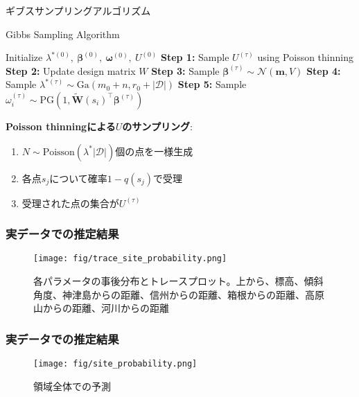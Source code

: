 \documentclass[xelatex, 8pt]{beamer}
\theoremstyle{plain}
\theoremstyle{definition}
\begin{document}
\begin{frame}{ギブスサンプリングアルゴリズム}
    \begin{algorithm}[H]
    \caption{Gibbs Sampling Algorithm}
    \begin{algorithmic}
    \STATE Initialize $\lambda^{*(0)},\ \boldsymbol{\beta}^{(0)},\ \boldsymbol{\omega}^{(0)},\ U^{(0)}$
        \STATE \textbf{Step 1:} Sample $U^{(\tau)}$ using Poisson thinning
        \STATE \textbf{Step 2:} Update design matrix $W$
        \STATE \textbf{Step 3:} Sample $\boldsymbol{\beta}^{(\tau)} \sim \mathcal{N}(\boldsymbol{m}, V)$
        \STATE \textbf{Step 4:} Sample $\lambda^{*(\tau)} \sim \text{Ga}(m_0 + n, r_0 + |\mathcal{D}|)$
        \STATE \textbf{Step 5:} Sample $\omega_i^{(\tau)} \sim \text{PG}(1, \tilde{\boldsymbol{W}}(s_i)^\top \boldsymbol{\beta}^{(\tau)})$
    \ENDFOR
    \end{algorithmic}
    \end{algorithm}

    \vspace{2mm}
    \textbf{Poisson thinningによる$U$のサンプリング}:
    \begin{enumerate}
        \item $N \sim \text{Poisson}(\lambda^* |\mathcal{D}|)$個の点を一様生成
        \item 各点$s_j$について確率$1-q(s_j)$で受理
        \item 受理された点の集合が$U^{(\tau)}$
    \end{enumerate}
\end{frame}

\begin{frame}\frametitle{実データでの推定結果}
\begin{figure}\centering\texttt{[image: fig/trace\_site\_probability.png]}\caption{各パラメータの事後分布とトレースプロット。上から、標高、傾斜角度、神津島からの距離、信州からの距離、箱根からの距離、高原山からの距離、河川からの距離}
\end{figure}
\end{frame}

\begin{frame}\frametitle{実データでの推定結果}
\begin{figure}\centering\texttt{[image: fig/site\_probability.png]}\caption{領域全体での予測}
\end{figure}
\end{frame}
\end{document}
